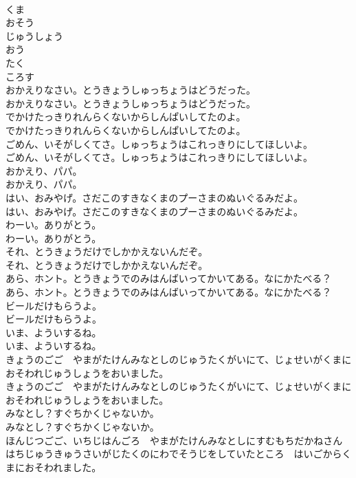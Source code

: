 \documentclass[8pt]{extreport}
\begin{document}
\begin{CJK}{UTF8}{min}
\\	くま
\\	おそう
\\	じゅうしょう
\\	おう
\\	たく
\\	ころす
\\	おかえりなさい。とうきょうしゅっちょうはどうだった。
\\	おかえりなさい。とうきょうしゅっちょうはどうだった。
\\	でかけたっきりれんらくないからしんぱいしてたのよ。
\\	でかけたっきりれんらくないからしんぱいしてたのよ。
\\	ごめん、いそがしくてさ。しゅっちょうはこれっきりにしてほしいよ。
\\	ごめん、いそがしくてさ。しゅっちょうはこれっきりにしてほしいよ。
\\	おかえり、パパ。
\\	おかえり、パパ。
\\	はい、おみやげ。さだこのすきなくまのプーさまのぬいぐるみだよ。
\\	はい、おみやげ。さだこのすきなくまのプーさまのぬいぐるみだよ。
\\	わーい。ありがとう。
\\	わーい。ありがとう。
\\	それ、とうきょうだけでしかかえないんだぞ。
\\	それ、とうきょうだけでしかかえないんだぞ。
\\	あら、ホント。とうきょうでのみはんばいってかいてある。なにかたべる？
\\	あら、ホント。とうきょうでのみはんばいってかいてある。なにかたべる？
\\	ビールだけもらうよ。
\\	ビールだけもらうよ。
\\	いま、よういするね。
\\	いま、よういするね。
\\	きょうのごご　やまがたけんみなとしのじゅうたくがいにて、じょせいがくまにおそわれじゅうしょうをおいました。
\\	きょうのごご　やまがたけんみなとしのじゅうたくがいにて、じょせいがくまにおそわれじゅうしょうをおいました。
\\	みなとし？すぐちかくじゃないか。
\\	みなとし？すぐちかくじゃないか。
\\	ほんじつごご、いちじはんごろ　やまがたけんみなとしにすむもちだかねさんはちじゅうきゅうさいがじたくのにわでそうじをしていたところ　はいごからくまにおそわれました。

\end{CJK}
\end{document}
